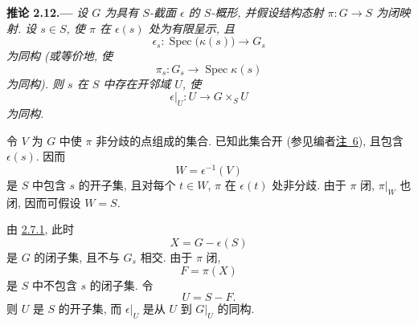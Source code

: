 \medskip
{}\label{cor:sga3-VIB-2.12}%
\noindent\textbf{推论 2.12.---}
\emph{设 \(G\) 为具有 \(S\)-截面 \(\epsilon\) 的 \(S\)-概形,
并假设结构态射 \(\pi:G\to S\) 为闭映射.
设 \(s\in S\), 使 \(\pi\) 在 \(\epsilon(s)\) 处为有限呈示, 且}
\[
  \epsilon_s:\operatorname{Spec}\bigl(\kappa(s)\bigr)
    \longrightarrow G_s
\]
\emph{为同构 (或等价地, 使}
\[
  \pi_s:G_s\longrightarrow
    \operatorname{Spec}\kappa(s)
\]
\emph{为同构). 则 \(s\) 在 \(S\) 中存在开邻域 \(U\), 使}
\[
  \epsilon|_U:U\longrightarrow G\times_SU
\]
\emph{为同构.}

令 \(V\) 为 \(G\) 中使 \(\pi\) 非分歧的点组成的集合.
已知此集合开 (参见编者\hyperref[note:sga3-VIB-6]{注~6}),
且包含 \(\epsilon(s)\). 因而
\[
  W=\epsilon^{-1}(V)
\]
是 \(S\) 中包含 \(s\) 的开子集,
且对每个 \(t\in W\), \(\pi\) 在 \(\epsilon(t)\) 处非分歧.
由于 \(\pi\) 闭, \(\pi|_W\) 也闭, 因而可假设 \(W=S\).

由 \hyperref[lem:sga3-VIB-2.7.1]{2.7.1}, 此时
\[
  X=G-\epsilon(S)
\]
是 \(G\) 的闭子集, 且不与 \(G_s\) 相交.
由于 \(\pi\) 闭,
\[
  F=\pi(X)
\]
是 \(S\) 中不包含 \(s\) 的闭子集. 令
\[
  U=S-F.
\]
则 \(U\) 是 \(S\) 的开子集,
而 \(\epsilon|_U\) 是从 \(U\) 到 \(G|_U\) 的同构.
